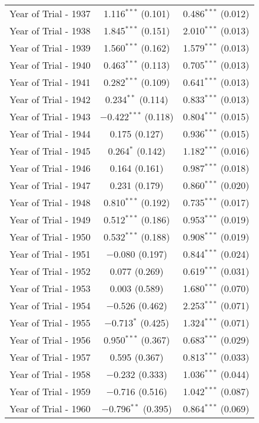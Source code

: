 \begin{table}[!h]
\begin{tabular}{@{\extracolsep{5pt}}lcc}
  Year of Trial - 1937 & 1.116$^{***}$ (0.101) & 0.486$^{***}$ (0.012) \\ 
  Year of Trial - 1938 & 1.845$^{***}$ (0.151) & 2.010$^{***}$ (0.013) \\ 
  Year of Trial - 1939 & 1.560$^{***}$ (0.162) & 1.579$^{***}$ (0.013) \\ 
  Year of Trial - 1940 & 0.463$^{***}$ (0.113) & 0.705$^{***}$ (0.013) \\ 
  Year of Trial - 1941 & 0.282$^{***}$ (0.109) & 0.641$^{***}$ (0.013) \\ 
  Year of Trial - 1942 & 0.234$^{**}$ (0.114) & 0.833$^{***}$ (0.013) \\ 
  Year of Trial - 1943 & $-$0.422$^{***}$ (0.118) & 0.804$^{***}$ (0.015) \\ 
  Year of Trial - 1944 & 0.175 (0.127) & 0.936$^{***}$ (0.015) \\ 
  Year of Trial - 1945 & 0.264$^{*}$ (0.142) & 1.182$^{***}$ (0.016) \\ 
  Year of Trial - 1946 & 0.164 (0.161) & 0.987$^{***}$ (0.018) \\ 
  Year of Trial - 1947 & 0.231 (0.179) & 0.860$^{***}$ (0.020) \\ 
  Year of Trial - 1948 & 0.810$^{***}$ (0.192) & 0.735$^{***}$ (0.017) \\ 
  Year of Trial - 1949 & 0.512$^{***}$ (0.186) & 0.953$^{***}$ (0.019) \\ 
  Year of Trial - 1950 & 0.532$^{***}$ (0.188) & 0.908$^{***}$ (0.019) \\ 
  Year of Trial - 1951 & $-$0.080 (0.197) & 0.844$^{***}$ (0.024) \\ 
  Year of Trial - 1952 & 0.077 (0.269) & 0.619$^{***}$ (0.031) \\ 
  Year of Trial - 1953 & 0.003 (0.589) & 1.680$^{***}$ (0.070) \\ 
  Year of Trial - 1954 & $-$0.526 (0.462) & 2.253$^{***}$ (0.071) \\ 
  Year of Trial - 1955 & $-$0.713$^{*}$ (0.425) & 1.324$^{***}$ (0.071) \\ 
  Year of Trial - 1956 & 0.950$^{***}$ (0.367) & 0.683$^{***}$ (0.029) \\ 
  Year of Trial - 1957 & 0.595 (0.367) & 0.813$^{***}$ (0.033) \\ 
  Year of Trial - 1958 & $-$0.232 (0.333) & 1.036$^{***}$ (0.044) \\ 
  Year of Trial - 1959 & $-$0.716 (0.516) & 1.042$^{***}$ (0.087) \\ 
  Year of Trial - 1960 & $-$0.796$^{**}$ (0.395) & 0.864$^{***}$ (0.069) \\ 

\end{tabular}
\end{table}
